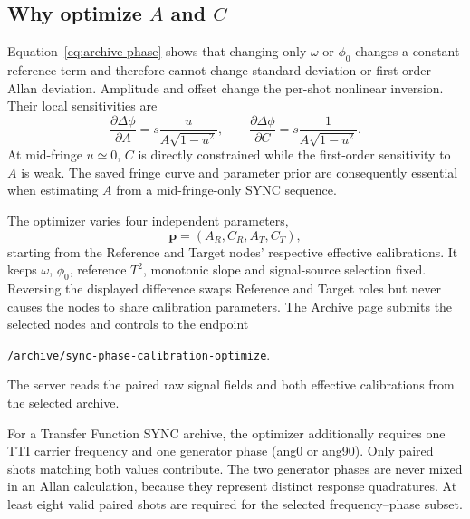 \documentclass[11pt,oneside,openany]{book}
\newcommand{\pathcode}[1]{\nolinkurl{#1}}
\begin{document}
\subsection{Why optimize $A$ and $C$}
Equation~\eqref{eq:archive-phase} shows that changing only $\omega$ or $\phi_0$ changes a
constant reference term and therefore cannot change standard deviation or first-order
Allan deviation. Amplitude and offset change the per-shot nonlinear inversion. Their
local sensitivities are
\begin{equation}
  \frac{\partial\Delta\phi}{\partial A}
  =s\frac{u}{A\sqrt{1-u^2}},\qquad
  \frac{\partial\Delta\phi}{\partial C}
  =s\frac{1}{A\sqrt{1-u^2}}.
\end{equation}
At mid-fringe $u\simeq0$, $C$ is directly constrained while the first-order sensitivity
to $A$ is weak. The saved fringe curve and parameter prior are consequently essential
when estimating $A$ from a mid-fringe-only SYNC sequence.

The optimizer varies four independent parameters,
\begin{equation}
  \mathbf p=(A_R,C_R,A_T,C_T),
\end{equation}
starting from the Reference and Target nodes' respective effective calibrations. It keeps
$\omega$, $\phi_0$, reference $T^2$, monotonic slope and signal-source selection fixed.
Reversing the displayed difference swaps Reference and Target roles but never causes the
nodes to share calibration parameters.
The Archive page submits the selected nodes and controls to the endpoint
\begin{center}
\pathcode{/archive/sync-phase-calibration-optimize}.
\end{center}
The server reads the paired raw signal fields and both effective calibrations from the
selected archive.

For a Transfer Function SYNC archive, the optimizer additionally requires one TTI carrier
frequency and one generator phase (ang{0} or ang{90}). Only paired shots matching both
values contribute. The two generator phases are never mixed in an Allan calculation,
because they represent distinct response quadratures. At least eight valid paired shots
are required for the selected frequency--phase subset.
\end{document}
